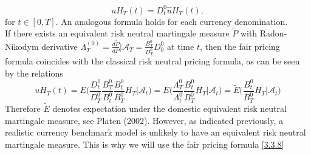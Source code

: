 \documentclass[a4 paper, 12pt]{report}
\theoremstyle{plain}
\begin{document}
\begin{equation}\label{3.3.8}
uH_T(t) = D^0_t\hat{u}H_T(t),
\end{equation}
for $t\in[0,T]$. An analogous formula holds for each currency denomination.\\
If there exists an equivalent risk neutral martingale measure $\tilde{P}$ with Radon-Nikodym derivative $\Lambda_T^{(0)} = \frac{d\tilde{P}}{dP}\bigg|\mathcal{A}_T = \frac{B_T^0}{D_T^0}D_0^0$ at time $t$, then the fair pricing formula coincides with the classical risk neutral pricing formula, as can be seen by the relations
\begin{equation}\label{3.3.9}
uH_T(t) = E\bigg(\frac{D_t^0}{D_T^0}\frac{B_T^0}{B_t^0}\frac{B_t^0}{B_T^0}H_T\bigg|\mathcal{A}_t\bigg) = E\bigg(\frac{\Lambda_T^0}{\Lambda_t^0}\frac{B_t^0}{B_T^0}H_T\bigg|\mathcal{A}_t\bigg) = \tilde{E}\bigg(\frac{B_t^0}{B_T^0}H_T\bigg|\mathcal{A}_t\bigg)
\end{equation}
Therefore $\tilde{E}$ denotes expectation under the domestic equivalent risk neutral
martingale measure, see Platen (2002). However, as indicated previously, a
realistic currency benchmark model is unlikely to have an equivalent risk neutral
martingale measure. This is why we will use the fair pricing formula \eqref{3.3.8}
\end{document}
